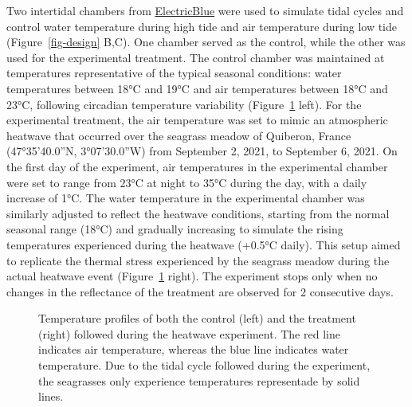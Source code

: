 \documentclass[
  number]{elsarticle}
\begin{document}
Two intertidal chambers from
\href{https://electricblue.eu/intertidal-chamber}{ElectricBlue} were
used to simulate tidal cycles and control water temperature during high
tide and air temperature during low tide (Figure~\ref{fig-design} B,C).
One chamber served as the control, while the other was used for the
experimental treatment. The control chamber was maintained at
temperatures representative of the typical seasonal conditions: water
temperatures between 18°C and 19°C and air temperatures between 18°C and
23°C, following circadian temperature variability
(Figure~\ref{fig-Profile} left). For the experimental treatment, the air
temperature was set to mimic an atmospheric heatwave that occurred over
the seagrass meadow of Quiberon, France (47°35'40.0''N, 3°07'30.0''W)
from September 2, 2021, to September 6, 2021. On the first day of the
experiment, air temperatures in the experimental chamber were set to
range from 23°C at night to 35°C during the day, with a daily increase
of 1°C. The water temperature in the experimental chamber was similarly
adjusted to reflect the heatwave conditions, starting from the normal
seasonal range (18°C) and gradually increasing to simulate the rising
temperatures experienced during the heatwave (+0.5°C daily). This setup
aimed to replicate the thermal stress experienced by the seagrass meadow
during the actual heatwave event (Figure~\ref{fig-Profile} right). The
experiment stops only when no changes in the reflectance of the
treatment are observed for 2 consecutive days.

\label{cell-fig-Profile}
\begin{figure}[H]


\caption{\label{fig-Profile}Temperature profiles of both the control
(left) and the treatment (right) followed during the heatwave
experiment. The red line indicates air temperature, whereas the blue
line indicates water temperature. Due to the tidal cycle followed during
the experiment, the seagrasses only experience temperatures representade
by solid lines.}

\end{figure}%
\end{document}
